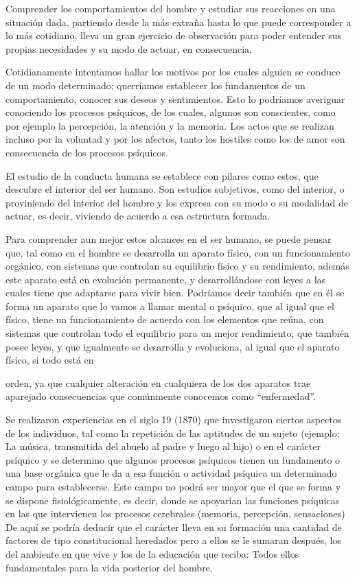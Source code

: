 Comprender los comportamientos del hombre y estudiar sus reacciones en una situación dada, partiendo desde la más extraña hasta lo que puede corresponder a lo más cotidiano, lleva un gran ejercicio de observación para poder entender sus propias necesidades y su modo de actuar, en consecuencia.

Cotidianamente intentamos hallar los motivos por los cuales alguien se conduce de un modo determinado; querríamos establecer los fundamentos de un comportamiento, conocer sus deseos y sentimientos. Esto lo podríamos averiguar conociendo los procesos psíquicos, de los cuales, algunos son conscientes, como por ejemplo la percepción, la atención y la memoria. Los actos que se realizan incluso por la voluntad y por los afectos, tanto los hostiles como los de amor son consecuencia de los procesos psíquicos.

El estudio de la conducta humana se establece con pilares como estos, que descubre el interior del ser humano. Son estudios subjetivos, como del interior, o proviniendo del interior del hombre y los expresa con su modo o su modalidad de actuar, es decir, viviendo de acuerdo a esa estructura formada.

Para comprender aun mejor estos alcances en el ser humano, se puede pensar que, tal como en el hombre se desarrolla un aparato físico, con un funcionamiento orgánico, con sistemas que controlan su equilibrio físico y su rendimiento, además este aparato  está en evolución permanente, y desarrollándose con leyes a las cuales tiene que adaptarse para vivir bien. Podríamos decir también que en él se forma un aparato que lo vamos a llamar mental o psíquico, que al igual que el físico, tiene un funcionamiento de acuerdo con los elementos que reúna, con sistemas que controlan todo el equilibrio para un mejor rendimiento; que también posee leyes, y que igualmente se desarrolla y evoluciona, al igual que el aparato físico, si todo está en



orden, ya que cualquier alteración en cualquiera de los dos aparatos trae aparejado consecuencias que comúnmente conocemos como “enfermedad”.

Se realizaron experiencias en el siglo 19 (1870) que investigaron ciertos aspectos de los individuos, tal como la repetición de las aptitudes de un sujeto (ejemplo: La música, transmitida del abuelo al padre y luego al hijo) o en el carácter psíquico y se determino que algunos procesos psíquicos tienen un fundamento o una base orgánica que le da a esa función o actividad psíquica un determinado campo para establecerse. Este campo no podrá ser mayor que el que se forma y se dispone fisiológicamente, es decir, donde se apoyarían las funciones psíquicas en las que intervienen los procesos cerebrales (memoria, percepción, sensaciones) De aquí se podría deducir que el carácter lleva en su formación una cantidad de factores de tipo constitucional heredados pero a ellos se le sumaran después, los del ambiente en que vive y los de la educación que reciba: Todos ellos fundamentales para la vida posterior del hombre.

